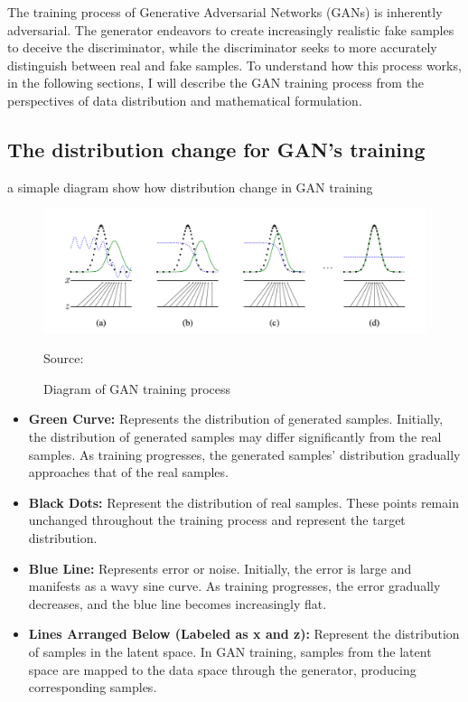 The training process of Generative Adversarial Networks (GANs) is inherently adversarial. 
The generator endeavors to create increasingly realistic fake samples to deceive the discriminator, 
while the discriminator seeks to more accurately distinguish between real and fake samples. 
To understand how this process works, in the following sections, 
I will describe the GAN training process from the perspectives of data distribution and mathematical formulation.

\subsection{The distribution change for GAN's training}
a simaple diagram show how distribution change in GAN training


\begin{figure}[H]
    \centering
    \includegraphics[width=1.2\linewidth]{./Images/data_distribution.jpg}
    \caption{Diagram of GAN training process}
    \label{fig:my_picture}
    \vspace{1pt} %
    \small{Source: \cite{goodfellow2014generative}}
\end{figure}


\begin{itemize}
    \item \textbf{ Green Curve:} Represents the distribution of generated samples. Initially, the distribution of generated samples may differ significantly from the real samples. As training progresses, the generated samples’ distribution gradually approaches that of the real samples.
    \item \textbf{Black Dots:} Represent the distribution of real samples. These points remain unchanged throughout the training process and represent the target distribution.
    \item \textbf{ Blue Line:} Represents error or noise. Initially, the error is large and manifests as a wavy sine curve. As training progresses, the error gradually decreases, and the blue line becomes increasingly flat.
    \item \textbf{ Lines Arranged Below (Labeled as x and z):} Represent the distribution of samples in the latent space. In GAN training, samples from the latent space are mapped to the data space through the generator, producing corresponding samples.
\end{itemize}


